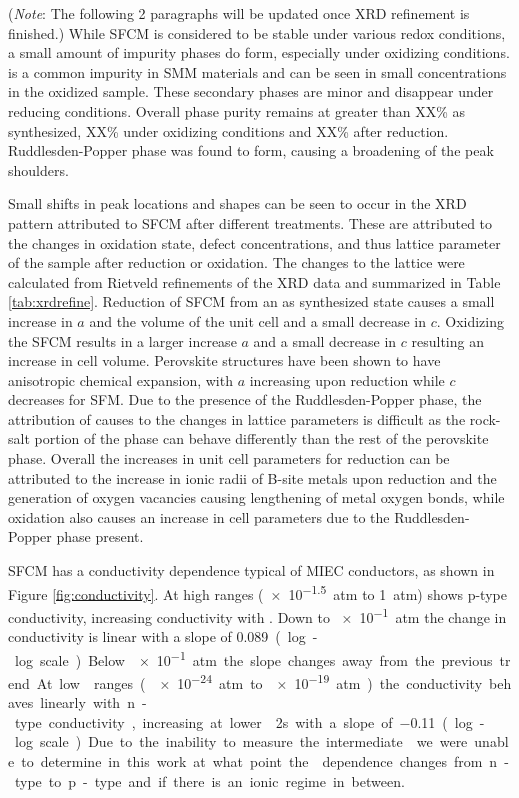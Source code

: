     (\emph{Note}: The following 2 paragraphs will be updated once XRD refinement is finished.)
    While SFCM is considered to be stable under various redox conditions, a small amount of impurity phases do form, especially under oxidizing conditions. %
     is a common impurity in SMM materials and can be seen in small concentrations in the oxidized sample.
    These secondary phases are minor and disappear under reducing conditions.
    Overall phase purity remains at greater than XX\% as synthesized, XX\% under oxidizing conditions and XX\% after reduction.
    Ruddlesden-Popper phase was found to form, causing a broadening of the peak shoulders.

    Small shifts in peak locations and shapes can be seen to occur in the XRD pattern attributed to SFCM after different treatments.
    These are attributed to the changes in oxidation state, defect concentrations, and thus lattice parameter of the sample after reduction or oxidation.
    The changes to the lattice were calculated from Rietveld refinements of the XRD data and summarized in Table \ref{tab:xrdrefine}.
    Reduction of SFCM from an as synthesized state causes a small increase in $a$ and the volume of the unit cell and a small decrease in $c$.
    Oxidizing the SFCM results in a larger increase $a$ and a small decrease in $c$ resulting an increase in cell volume.
    Perovskite structures have been shown to have anisotropic chemical expansion, with $a$ increasing upon reduction while $c$ decreases for SFM.\cite{Tsvetkov2016}
    Due to the presence of the Ruddlesden-Popper phase, the attribution of causes to the changes in lattice parameters is difficult as the rock-salt portion of the phase can behave differently than the rest of the perovskite phase.\cite{Bishop2014}
    Overall the increases in unit cell parameters for reduction can be attributed to the increase in ionic radii of B-site metals upon reduction and the generation of oxygen vacancies causing lengthening of metal oxygen bonds, while oxidation also causes an increase in cell parameters due to the Ruddlesden-Popper phase present.

    SFCM has a conductivity dependence typical of MIEC conductors, as shown in Figure \ref{fig:conductivity}.
    At high  ranges (\SI{e-1.5}{atm} to \SI{1}{atm}) shows p-type conductivity, increasing conductivity with .
    Down to \SI{e-1}{atm} the change in conductivity is linear with a slope of \SI{0.089} (log-log scale).
    Below \SI{e-1}{atm} the slope changes away from the previous trend.
    At low  ranges (\SI{e-24}{atm} to \SI{e-19}{atm}) the conductivity behaves linearly with n-type conductivity, increasing at lower \po2s with a slope of \SI{-0.11} (log-log scale).
    Due to the inability to measure the intermediate  we were unable to determine in this work at what point the  dependence changes from n-type to p-type and if there is an ionic regime in between.

